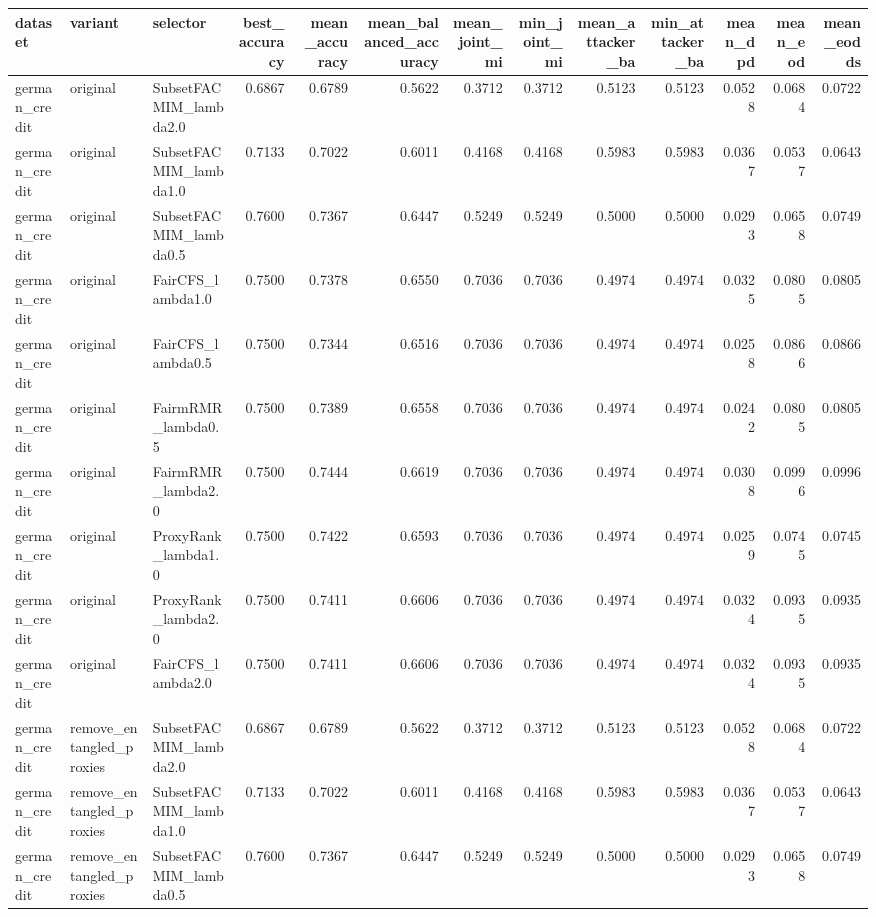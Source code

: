 \begin{tabular}{lllrrrrrrrrrr}
\toprule
dataset & variant & selector & best_accuracy & mean_accuracy & mean_balanced_accuracy & mean_joint_mi & min_joint_mi & mean_attacker_ba & min_attacker_ba & mean_dpd & mean_eod & mean_eodds \\
\midrule
german_credit & original & SubsetFACMIM_lambda2.0 & 0.6867 & 0.6789 & 0.5622 & 0.3712 & 0.3712 & 0.5123 & 0.5123 & 0.0528 & 0.0684 & 0.0722 \\
german_credit & original & SubsetFACMIM_lambda1.0 & 0.7133 & 0.7022 & 0.6011 & 0.4168 & 0.4168 & 0.5983 & 0.5983 & 0.0367 & 0.0537 & 0.0643 \\
german_credit & original & SubsetFACMIM_lambda0.5 & 0.7600 & 0.7367 & 0.6447 & 0.5249 & 0.5249 & 0.5000 & 0.5000 & 0.0293 & 0.0658 & 0.0749 \\
german_credit & original & FairCFS_lambda1.0 & 0.7500 & 0.7378 & 0.6550 & 0.7036 & 0.7036 & 0.4974 & 0.4974 & 0.0325 & 0.0805 & 0.0805 \\
german_credit & original & FairCFS_lambda0.5 & 0.7500 & 0.7344 & 0.6516 & 0.7036 & 0.7036 & 0.4974 & 0.4974 & 0.0258 & 0.0866 & 0.0866 \\
german_credit & original & FairmRMR_lambda0.5 & 0.7500 & 0.7389 & 0.6558 & 0.7036 & 0.7036 & 0.4974 & 0.4974 & 0.0242 & 0.0805 & 0.0805 \\
german_credit & original & FairmRMR_lambda2.0 & 0.7500 & 0.7444 & 0.6619 & 0.7036 & 0.7036 & 0.4974 & 0.4974 & 0.0308 & 0.0996 & 0.0996 \\
german_credit & original & ProxyRank_lambda1.0 & 0.7500 & 0.7422 & 0.6593 & 0.7036 & 0.7036 & 0.4974 & 0.4974 & 0.0259 & 0.0745 & 0.0745 \\
german_credit & original & ProxyRank_lambda2.0 & 0.7500 & 0.7411 & 0.6606 & 0.7036 & 0.7036 & 0.4974 & 0.4974 & 0.0324 & 0.0935 & 0.0935 \\
german_credit & original & FairCFS_lambda2.0 & 0.7500 & 0.7411 & 0.6606 & 0.7036 & 0.7036 & 0.4974 & 0.4974 & 0.0324 & 0.0935 & 0.0935 \\
german_credit & remove_entangled_proxies & SubsetFACMIM_lambda2.0 & 0.6867 & 0.6789 & 0.5622 & 0.3712 & 0.3712 & 0.5123 & 0.5123 & 0.0528 & 0.0684 & 0.0722 \\
german_credit & remove_entangled_proxies & SubsetFACMIM_lambda1.0 & 0.7133 & 0.7022 & 0.6011 & 0.4168 & 0.4168 & 0.5983 & 0.5983 & 0.0367 & 0.0537 & 0.0643 \\
german_credit & remove_entangled_proxies & SubsetFACMIM_lambda0.5 & 0.7600 & 0.7367 & 0.6447 & 0.5249 & 0.5249 & 0.5000 & 0.5000 & 0.0293 & 0.0658 & 0.0749 \\

\end{tabular}
